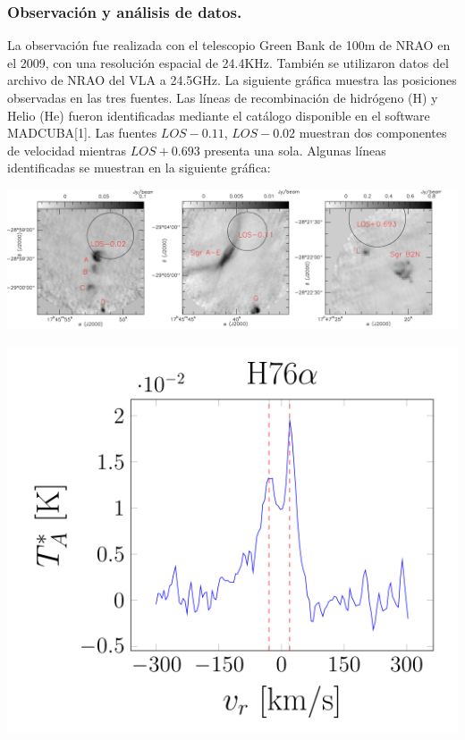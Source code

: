 \documentclass[8pt]{beamer}
\begin{document}
\begin{frame}
\frametitle{Observación y análisis de datos.}
La observación fue realizada con el telescopio Green Bank de 100m de NRAO  en el 2009, con una resolución espacial de 24.4KHz. También se utilizaron datos del archivo de NRAO del VLA a 24.5GHz. La siguiente gráfica muestra las posiciones observadas en las tres fuentes.
Las líneas de recombinación de hidrógeno (H) y Helio (He) fueron identificadas mediante el catálogo disponible en el software MADCUBA[1].
Las fuentes  $LOS-0.11$, $LOS-0.02$ muestran dos componentes de velocidad mientras $LOS+0.693$ presenta una sola. Algunas líneas identificadas se muestran en la siguiente gráfica:\\
\begin{minipage}[t]{0.50\linewidth}
\includegraphics[width=\linewidth]{figures/los1.png}
\end{minipage}
\begin{minipage}[t]{0.24\linewidth}
\includegraphics[width=0.95\linewidth]{figures/rrl1.png}

\end{minipage}
\end{frame}
\end{document}
